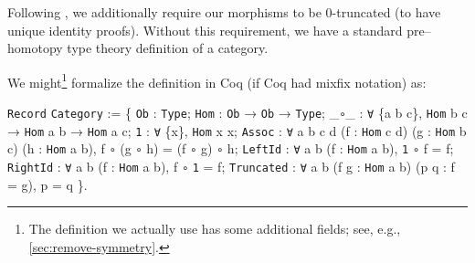 \documentclass[runningheads]{llncs}
\makeatletter
\gdef\@makeopenbrace<\catcode`{>
\gdef\@makeclosebrace<\catcode`}>
\newcommand{\processcommands}[1]{{%
  \catcode`\\=0\relax
  \@makeopenbrace=1\relax
  \@makeclosebrace=2\relax
  \def\{{\texttt{\mytextbraceleft}}
  \def\}{\texttt{\mytextbraceright}}
  \scantokens{#1}%
}}
\newcommand{\processcommandsinverbatimline}{\expandafter\processcommands\expandafter{\the\verbatim@line}}
\newenvironment{coqcode}{\begingroup
  \vspace{0.5\baselineskip}
  \let\trivlist\relax
  \let\endtrivlist\relax
  \let\item\relax
  \setlength{\parsep}{0pt}%
  \setlength{\parskip}{0pt}%
  \setlength{\topsep}{0pt}%
  \setlength{\@topsepadd}{0pt}%
  \setlength{\partopsep}{0pt}%
  \setlength{\@topsep}{0pt}%
  \let\old@@par\@@par
  \let\@@par\relax
  \let\old@vskip\vskip
  \let\vskip\relax
  \verbatim
  \let\@@par\old@@par
  \let\vskip\old@vskip
  \let\verbatim@processline=\processcommandsinverbatimline
}{\endverbatim\endgroup\vspace{0.5\baselineskip}}
\newcommand{\colortext}[2]{\textcolor{#1}{#2}}
\newcommand{\coqdockw}[1]{\texttt {\colortext{kwred}{#1}}}
\newcommand{\coqdocvar}[1]{\colortext{varpurple}{#1}}
\newcommand{\coqdoccst}[1]{\texttt{\colortext{defgreen}{#1}}}%
\newcommand{\coqdocind}[1]{\texttt{\colortext{indblue}{#1}}}%
\newcommand{\coqdocvariable}[1]{\coqdocvar{#1}}
\newcommand{\coqdocmethod}[1]{\coqdoccst{#1}}
\newcommand{\coqdocrecord}[1]{\coqdocind{#1}}
\newcommand{\coqdocprojection}[1]{\coqdoccst{#1}}
\makeatother
\begin{document}
    Following \cite{HoTTBook}, we additionally require our morphisms to be 0-truncated (to have unique identity proofs).  Without this requirement, we have a standard pre-- homotopy type theory definition of a category.

    We might\footnote{The definition we actually use has some additional fields; see, e.g., \autoref{sec:remove-symmetry}.} formalize the definition in Coq (if Coq had mixfix notation) as: \label{def:category}
\begin{coqcode}
\coqdockw{Record} \coqdocrecord{Category} :=
  \{ \coqdocprojection{Ob} : \coqdockw{Type};
    \coqdocprojection{Hom} : \coqdocmethod{Ob} → \coqdocmethod{Ob} → \coqdockw{Type};
    _\coqdocprojection{∘}_ : \coqdockw{∀} \{\coqdocvariable{a} \coqdocvariable{b} \coqdocvariable{c}\}, \coqdocmethod{Hom} \coqdocvariable{b} \coqdocvariable{c} → \coqdocmethod{Hom} \coqdocvariable{a} \coqdocvariable{b} → \coqdocmethod{Hom} \coqdocvariable{a} \coqdocvariable{c};
    \coqdocprojection{1} : \coqdockw{∀} \{\coqdocvariable{x}\}, \coqdocmethod{Hom} \coqdocvariable{x} \coqdocvariable{x};
    \coqdocprojection{Assoc} : \coqdockw{∀} \coqdocvariable{a} \coqdocvariable{b} \coqdocvariable{c} \coqdocvariable{d} (\coqdocvariable{f} : \coqdocmethod{Hom} \coqdocvariable{c} \coqdocvariable{d}) (\coqdocvariable{g} : \coqdocmethod{Hom} \coqdocvariable{b} \coqdocvariable{c}) (\coqdocvariable{h} : \coqdocmethod{Hom} \coqdocvariable{a} \coqdocvariable{b}),
      \coqdocvariable{f} \coqdocmethod{∘} (\coqdocvariable{g} \coqdocmethod{∘} \coqdocvariable{h}) = (\coqdocvariable{f} \coqdocmethod{∘} \coqdocvariable{g}) \coqdocmethod{∘} \coqdocvariable{h};
    \coqdocprojection{LeftId} : \coqdockw{∀} \coqdocvariable{a} \coqdocvariable{b} (\coqdocvariable{f} : \coqdocmethod{Hom} \coqdocvariable{a} \coqdocvariable{b}), \coqdocmethod{1} \coqdocmethod{∘} \coqdocvariable{f} = \coqdocvariable{f};
    \coqdocprojection{RightId} : \coqdockw{∀} \coqdocvariable{a} \coqdocvariable{b} (\coqdocvariable{f} : \coqdocmethod{Hom} \coqdocvariable{a} \coqdocvariable{b}), \coqdocvariable{f} \coqdocmethod{∘} \coqdocmethod{1} = \coqdocvariable{f};
    \coqdocprojection{Truncated} : \coqdockw{∀} \coqdocvariable{a} \coqdocvariable{b} (\coqdocvariable{f} \coqdocvariable{g} : \coqdocmethod{Hom} \coqdocvariable{a} \coqdocvariable{b}) (\coqdocvariable{p} \coqdocvariable{q} : \coqdocvariable{f} = \coqdocvariable{g}), \coqdocvariable{p} = \coqdocvariable{q} \}.
\end{coqcode}
\end{document}
